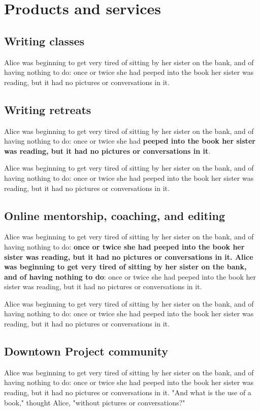 \documentclass[12pt]{article}
\begin{document}
\section{Products and services}
\label{sec:orgheadline12}

\subsection{Writing classes}
\label{sec:orgheadline7}
Alice was beginning to get very tired of sitting by her sister on the bank, and of having nothing to do: once or twice she had peeped into the book her sister was reading, but it had no pictures or conversations in it. 

\subsection{Writing retreats}
\label{sec:orgheadline8}
Alice was beginning to get very tired of sitting by her sister on the bank, and of having nothing to do: once or twice she had \textbf{peeped into the book her sister was reading, but it had no pictures or conversations in it}. 

Alice was beginning to get very tired of sitting by her sister on the bank, and of having nothing to do: once or twice she had peeped into the book her sister was reading, but it had no pictures or conversations in it. 

\subsection{Online mentorship, coaching, and editing}
\label{sec:orgheadline9}
Alice was beginning to get very tired of sitting by her sister on the bank, and of having nothing to do: \textbf{once or twice she had peeped into the book her sister was reading, but it had no pictures or conversations in it. Alice was beginning to get very tired of sitting by her sister on the bank, and of having nothing to do}: once or twice she had peeped into the book her sister was reading, but it had no pictures or conversations in it. 

Alice was beginning to get very tired of sitting by her sister on the bank, and of having nothing to do: once or twice she had peeped into the book her sister was reading, but it had no pictures or conversations in it. 

\subsection{Downtown Project community}
\label{sec:orgheadline10}
Alice was beginning to get very tired of sitting by her sister on the bank, and of having nothing to do: once or twice she had peeped into the book her sister was reading, but it had no pictures or conversations in it. "And what is the use of a book," thought Alice, "without pictures or conversations?" 
\end{document}
